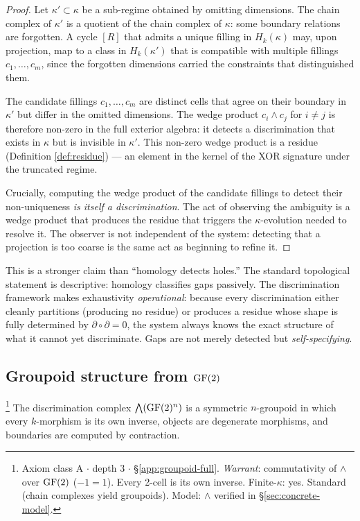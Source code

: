 \begin{proof}
Let $\kappa' \subset \kappa$ be a sub-regime obtained by
omitting dimensions. The chain complex of $\kappa'$ is a
quotient of the chain complex of $\kappa$: some boundary
relations are forgotten. A cycle $[R]$ that admits a unique
filling in $H_k(\kappa)$ may, upon projection, map to a
class in $H_k(\kappa')$ that is compatible with multiple
fillings $c_1, \ldots, c_m$, since the forgotten dimensions
carried the constraints that distinguished them.

The candidate fillings $c_1, \ldots, c_m$ are distinct cells
that agree on their boundary in $\kappa'$ but differ in
the omitted dimensions. The wedge product $c_i \wedge c_j$
for $i \neq j$ is therefore non-zero in the full exterior
algebra: it detects a discrimination that exists in $\kappa$
but is invisible in $\kappa'$. This non-zero wedge product
is a residue (Definition \ref{def:residue}) --- an element
in the kernel of the XOR signature under the truncated
regime.

Crucially, computing the wedge product of the candidate
fillings to detect their non-uniqueness \emph{is itself a
discrimination}. The act of observing the ambiguity is a
wedge product that produces the residue that triggers the
$\kappa$-evolution needed to resolve it. The observer is
not independent of the system: detecting that a projection
is too coarse is the same act as beginning to refine it.
\end{proof}

\begin{remark}
This is a stronger claim than ``homology detects holes.''
The standard topological statement is descriptive: homology
classifies gaps passively. The discrimination framework
makes exhaustivity \emph{operational}: because every
discrimination either cleanly partitions (producing no
residue) or produces a residue whose shape is fully
determined by $\partial \circ \partial = 0$, the system
always knows the exact structure of what it cannot yet
discriminate. Gaps are not merely detected but
\emph{self-specifying}.
\end{remark}

\subsection{Groupoid structure from $\operatorname{GF}(2)$}

\begin{theorem}\label{thm:groupoid}\footnote{Axiom class \textsf{A} $\cdot$ depth 3 $\cdot$ \S\ref{app:groupoid-full}.  \emph{Warrant}: commutativity of $\wedge$ over $\operatorname{GF}(2)$ ($-1 = 1$). Every 2-cell is its own inverse. Finite-$\kappa$: yes. Standard (chain complexes yield groupoids). Model: $\wedge$ verified in \S\ref{sec:concrete-model}.}
The discrimination complex $\bigwedge(\operatorname{GF}(2)^n)$ is a
symmetric $n$-groupoid in which every $k$-morphism is its own
inverse, objects are degenerate morphisms, and boundaries are
computed by contraction.
\end{theorem}

